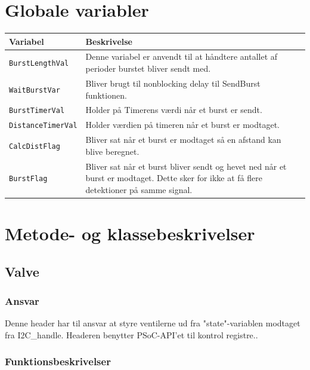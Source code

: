 \section{Globale variabler}
\begin{table}[H]
\begin{tabular}{|l|p{10cm}|}
\hline
\cellcolor[gray]{0.8}\textbf{Variabel} &\cellcolor[gray]{0.8} \textbf{Beskrivelse}\\ \hline
\texttt{BurstLengthVal} & Denne variabel er anvendt til at håndtere antallet af perioder burstet bliver sendt med.\\ \hline
\texttt{WaitBurstVar} & Bliver brugt til nonblocking delay til SendBurst funktionen.\\ \hline
\texttt{BurstTimerVal} & Holder på Timerens værdi når et burst er sendt.\\ \hline
\texttt{DistanceTimerVal} & Holder værdien på timeren når et burst er modtaget. \\ \hline
\texttt{CalcDistFlag} & Bliver sat når et burst er modtaget så en afstand kan blive beregnet.\\ \hline
\texttt{BurstFlag} & Bliver sat når et burst bliver sendt og hevet ned når et burst er modtaget. Dette sker for ikke at få flere detektioner på samme signal.\\ \hline
\end{tabular}
\end{table}
\section{Metode- og klassebeskrivelser}
\subsection{Valve}
\subsubsection{Ansvar}
Denne header har til ansvar at styre ventilerne ud fra "state"-variablen modtaget fra I2C\_handle. Headeren benytter PSoC-API'et til kontrol registre..
\subsubsection{Funktionsbeskrivelser}
 
